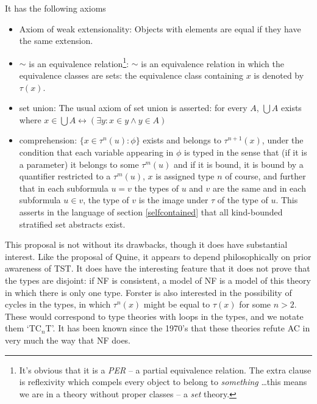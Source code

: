 \documentclass[12pt]{article}
\begin{document}
  It has the following axioms\begin{itemize}
\item Axiom of weak extensionality:  Objects with elements are equal if they have the same extension.

\item $\sim$ is an equivalence relation\footnote{It's obvious that it is a {\sl PER} -- a partial equivalence relation.  The extra clause is reflexivity which compels every object to belong to {\sl something} \ldots this means we are in a theory without proper classes -- a {\sl set} theory.}:  $\sim$ is an equivalence relation in which the equivalence classes are sets:  the equivalence class containing $x$ is denoted by $\tau(x)$.

\item set union:  The usual axiom of set union is asserted:  for every $A$, $\bigcup A$ exists where $x \in \bigcup A \leftrightarrow (\exists y:x \in y \wedge y \in A)$

\item comprehension:  $\{x \in \tau^n(u):\phi\}$ exists and belongs to $\tau^{n+1}(x)$, under the condition that each variable appearing in $\phi$ is typed in the sense that (if it is a parameter) it belongs to some $\tau^m(u)$ and if it is bound, it is bound by a quantifier restricted to a $\tau^m(u)$, $x$ is assigned type $n$ of course, and further that in each subformula $u=v$ the types of $u$ and $v$ are the same and in each subformula $u \in v$, the type of $v$ is the image under $\tau$ of the type of $u$.
This asserts in the language of section \ref{selfcontained} that all kind-bounded stratified set abstracts exist.
\end{itemize}


This proposal is not without its drawbacks, though it does have
substantial interest.  Like the proposal of Quine, it appears to
depend philosophically on prior awareness of TST.  It does have the
interesting feature that it does not prove that the types are
disjoint: if NF is consistent, a model of NF is a model of this theory
in which there is only one type.  Forster is also interested in the
possibility of cycles in the types, in which $\tau^n(x)$ might be
equal to $\tau(x)$ for some $n>2$.  These would correspond to type
theories with loops in the types, and we notate them `TC$_n$T'.  It has been known since the 1970's that these\label{TCT}
theories refute AC in very much the way that NF does.
\end{document}
